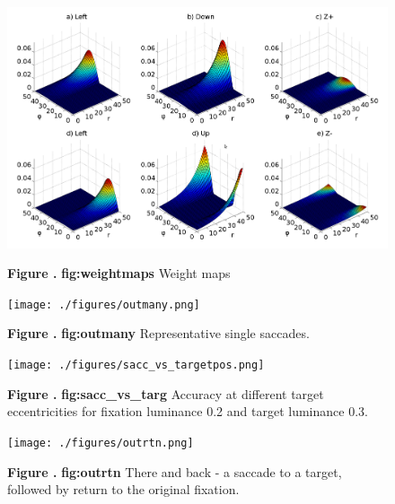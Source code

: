 \documentclass{frontiersSCNS}
\begin{document}
\begin{figure}[htb!]
\begin{center}
\includegraphics[width=\textwidth]{./figures/weightmaps.png}
\end{center}
\textbf{\label{fig:weightmaps} Figure .}
{ \textbf{fig:weightmaps} Weight maps}
\end{figure}

\begin{figure}[htb!]
\begin{center}
\texttt{[image: ./figures/outmany.png]}
\end{center}
\textbf{\label{fig:outmany} Figure .}
{ \textbf{fig:outmany} Representative single saccades.}
\end{figure}

\begin{figure}[htb!]
\begin{center}
\texttt{[image: ./figures/sacc\_vs\_targetpos.png]}
\end{center}
\textbf{\label{fig:sacc_vs_targ} Figure .}
{ \textbf{fig:sacc\_vs\_targ} Accuracy at different target eccentricities for fixation luminance 0.2 and target luminance 0.3.}
\end{figure}


\begin{figure}[htb!]
\begin{center}
\texttt{[image: ./figures/outrtn.png]}
\end{center}
\textbf{\label{fig:outrtn} Figure .}
{ \textbf{fig:outrtn} There and back - a saccade to a target, followed by return to the original fixation.}
\end{figure}
\end{document}
